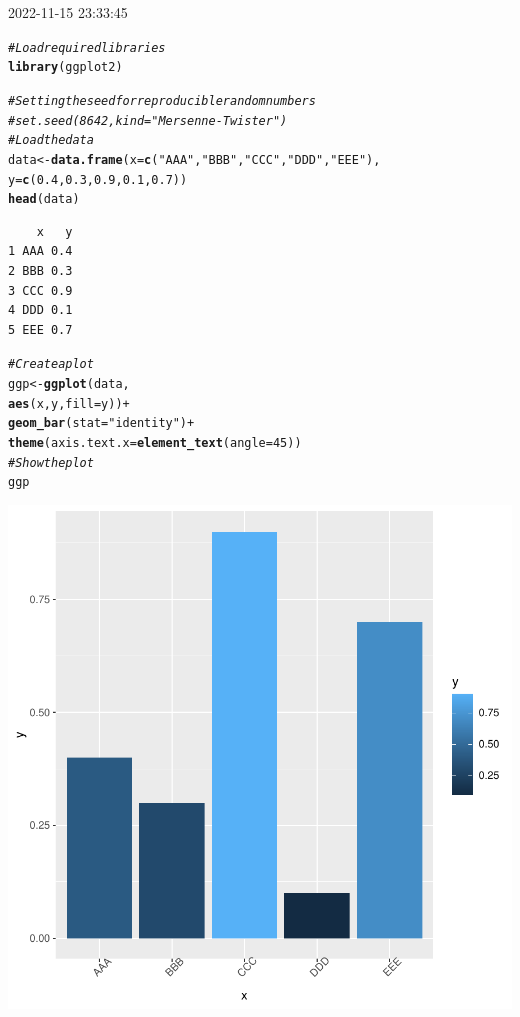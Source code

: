 \documentclass{article}\usepackage[]{graphicx}\usepackage[]{xcolor}
\makeatletter
\def\maxwidth{ %
  \ifdim\Gin@nat@width>\linewidth
    \linewidth
  \else
    \Gin@nat@width
  \fi
}
\newcommand{\hlnum}[1]{\textcolor[rgb]{0.686,0.059,0.569}{#1}}%
\newcommand{\hlstr}[1]{\textcolor[rgb]{0.192,0.494,0.8}{#1}}%
\newcommand{\hlcom}[1]{\textcolor[rgb]{0.678,0.584,0.686}{\textit{#1}}}%
\newcommand{\hlopt}[1]{\textcolor[rgb]{0,0,0}{#1}}%
\newcommand{\hlstd}[1]{\textcolor[rgb]{0.345,0.345,0.345}{#1}}%
\newcommand{\hlkwb}[1]{\textcolor[rgb]{0.69,0.353,0.396}{#1}}%
\newcommand{\hlkwc}[1]{\textcolor[rgb]{0.333,0.667,0.333}{#1}}%
\newcommand{\hlkwd}[1]{\textcolor[rgb]{0.737,0.353,0.396}{\textbf{#1}}}%
\newenvironment{kframe}{%
 \def\at@end@of@kframe{}%
 \ifinner\ifhmode%
  \def\at@end@of@kframe{\end{minipage}}%
  \begin{minipage}{\columnwidth}%
 \fi\fi%
 \def\FrameCommand##1{\hskip\@totalleftmargin \hskip-\fboxsep
 \colorbox{shadecolor}{##1}\hskip-\fboxsep
     \hskip-\linewidth \hskip-\@totalleftmargin \hskip\columnwidth}%
 \MakeFramed {\advance\hsize-\width
   \@totalleftmargin\z@ \linewidth\hsize
   \@setminipage}}%
 {\par\unskip\endMakeFramed%
 \at@end@of@kframe}
\newenvironment{knitrout}{}{} %
\makeatother
\begin{document}


2022-11-15 23:33:45
\begin{knitrout}
\color{fgcolor}\begin{kframe}
\begin{alltt}
\hlcom{# Load required libraries}
\hlkwd{library}\hlstd{(ggplot2)}
\end{alltt}


{\ttfamily\noindent\color{warningcolor}{Warning: package 'ggplot2' was built under R version 4.2.2}}\begin{alltt}
\hlcom{# Setting the seed for reproducible random numbers}
\hlcom{# set.seed(8642, kind = "Mersenne-Twister")}
\hlcom{# Load the data}
\hlstd{data} \hlkwb{<-} \hlkwd{data.frame}\hlstd{(}\hlkwc{x} \hlstd{=} \hlkwd{c}\hlstd{(}\hlstr{"AAA"}\hlstd{,}\hlstr{"BBB"}\hlstd{,}\hlstr{"CCC"}\hlstd{,}\hlstr{"DDD"}\hlstd{,}\hlstr{"EEE"}\hlstd{),}
                   \hlkwc{y} \hlstd{=} \hlkwd{c}\hlstd{(}\hlnum{0.4}\hlstd{,}\hlnum{0.3}\hlstd{,}\hlnum{0.9}\hlstd{,}\hlnum{0.1}\hlstd{,}\hlnum{0.7}\hlstd{))}
\hlkwd{head}\hlstd{(data)}
\end{alltt}
\begin{verbatim}
    x   y
1 AAA 0.4
2 BBB 0.3
3 CCC 0.9
4 DDD 0.1
5 EEE 0.7
\end{verbatim}
\begin{alltt}
\hlcom{# Create a plot}
\hlstd{ggp} \hlkwb{<-} \hlkwd{ggplot}\hlstd{(data,}
              \hlkwd{aes}\hlstd{(x, y,} \hlkwc{fill} \hlstd{= y))} \hlopt{+}
              \hlkwd{geom_bar}\hlstd{(}\hlkwc{stat} \hlstd{=} \hlstr{"identity"}\hlstd{)} \hlopt{+}
              \hlkwd{theme}\hlstd{(}\hlkwc{axis.text.x} \hlstd{=} \hlkwd{element_text}\hlstd{(}\hlkwc{angle} \hlstd{=} \hlnum{45}\hlstd{))}
\hlcom{# Show the plot}
\hlstd{ggp}
\end{alltt}
\end{kframe}

{\centering \includegraphics[width=\maxwidth]{figure/unnamed-chunk-1-1} 

}


\end{knitrout}
\end{document}
